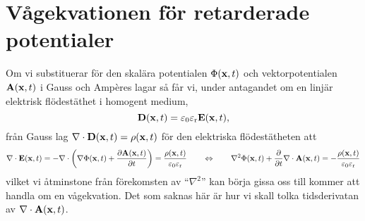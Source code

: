 \section{V{\aa}gekvationen f{\"o}r retarderade potentialer}
Om vi substituerar f{\"o}r den skal{\"a}ra potentialen $\Phi({\bf x},t)$ och
vektorpotentialen ${\bf A}({\bf x},t)$ i Gauss och Amp\`eres
lagar
s{\aa} f{\aa}r vi, under antagandet om en linj{\"a}r elektrisk
fl{\"o}dest{\"a}thet i homogent medium,
$$
  {\bf D}({\bf x},t)=\varepsilon_0\varepsilon_{\rm r}{\bf E}({\bf x},t),
$$
fr{\aa}n Gauss lag $\nabla\cdot{\bf D}({\bf x},t)=\rho({\bf x},t)$ f{\"o}r den
elektriska fl{\"o}dest{\"a}theten att
$$
  \nabla\cdot{\bf E}({\bf x},t)
    =-\nabla\cdot\bigg(
        \nabla\Phi({\bf x},t)+{{\partial{\bf A}({\bf x},t)}\over{\partial t}}
      \bigg)
    ={{\rho({\bf x},t)}\over{\varepsilon_0\varepsilon_{\rm r}}}
  \qquad\Leftrightarrow\qquad
    \nabla^2\Phi({\bf x},t)
      +{{\partial}\over{\partial t}}\nabla\cdot{\bf A}({\bf x},t)
    =-{{\rho({\bf x},t)}\over{\varepsilon_0\varepsilon_{\rm r}}}
$$
vilket vi {\aa}tminstone fr{\aa}n f{\"o}rekomsten av ``$\nabla^2$'' kan b{\"o}rja gissa oss till kommer att handla om en v{\aa}gekvation. Det som saknas h{\"a}r {\"a}r hur vi skall tolka tidsderivatan av $\nabla\cdot{\bf A}({\bf x},t)$.

